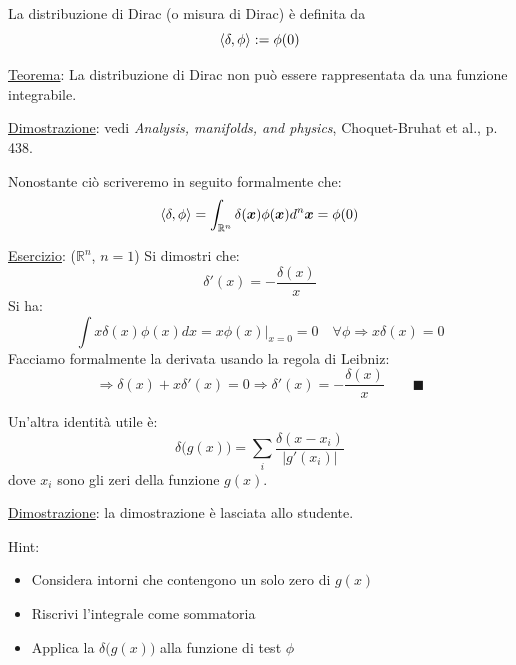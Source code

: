 \documentclass[a4paper,11pt]{report}
\newcommand{\Rn}{\mathbb{R}^n}
\newcommand{\x}{\boldsymbol{x}}
\begin{document}
La distribuzione di Dirac (o misura di Dirac) \`e definita da 
\begin{equation}
\Braket{\delta,\phi} := \phi(0) 
\end{equation}

\underline{Teorema}: La distribuzione di Dirac non pu\`o essere rappresentata da una funzione integrabile. 

\underline{Dimostrazione}: vedi \emph{Analysis, manifolds, and physics}, Choquet-Bruhat et al., p. 438. 

\medskip

Nonostante ci\`o scriveremo in seguito formalmente che:
\begin{equation}
\Braket{\delta , \phi} = \int_{\Rn} \delta (\x) \phi(\x) d^n \x= \phi(0) 
\end{equation}

\underline{Esercizio}: ($ \mathbb{R}^n$, $n=1$) Si dimostri che:
\begin{equation}
\delta' (x) =-\frac{\delta(x)}{x}
\end{equation}
Si ha:
\[
\int x\delta(x)\phi(x)dx = x\phi(x)\Big|_{x=0}=0 \quad \forall \phi \Rightarrow x\delta(x)=0
\]
Facciamo formalmente la derivata usando la regola di Leibniz:
\[
\Rightarrow \delta(x) + x\delta'(x)=0 \Rightarrow \delta ' (x) = -\frac{\delta(x)}{x}  \qquad \blacksquare
\]

Un'altra identit\`a utile \`e:
\begin{equation}
\delta\big(g(x)\big) = \sum_{i}\frac{\delta(x-x_i)}{|g'(x_i)|} 
\end{equation} 
dove $x_i$ sono gli zeri della funzione $g(x)$.

\underline{Dimostrazione}: la dimostrazione \`e lasciata allo studente.

Hint:
\begin{itemize}
\item Considera intorni che contengono un solo zero di $g(x)$
\item Riscrivi l'integrale come sommatoria
\item Applica la $\delta\big(g(x)\big)$ alla funzione di test $\phi$
\end{itemize}

\medskip
\end{document}
